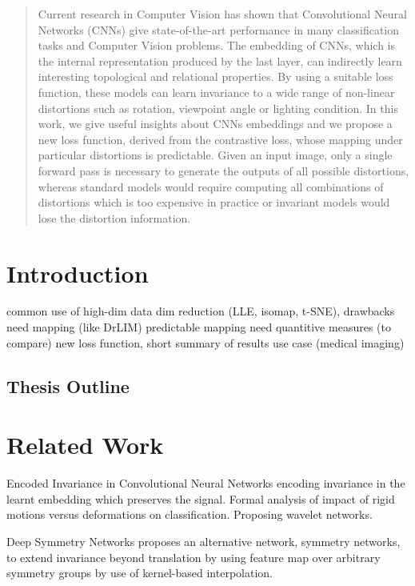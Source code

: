 \documentclass[a4paper,12pt]{report}
\begin{document}
\begin{abstract}
    Current research in Computer Vision has shown that Convolutional Neural Networks (CNNs) give state-of-the-art performance in many classification tasks and Computer Vision problems.
    The embedding of CNNs, which is the internal representation produced by the last layer, can indirectly learn interesting topological and relational properties.
    By using a suitable loss function, these models can learn invariance to a wide range of non-linear distortions such as rotation, viewpoint angle or lighting condition.
    In this work, we give useful insights about CNNs embeddings and we propose a new loss function, derived from the contrastive loss, whose mapping under particular distortions is predictable. 
    Given an input image, only a single forward pass is necessary to generate the outputs of all possible distortions, whereas standard models would require computing all combinations of distortions which is too expensive in practice or invariant models would lose the distortion information.
\end{abstract}

\chapter{Introduction}
common use of high-dim data
dim reduction (LLE, isomap, t-SNE), drawbacks
need mapping (like DrLIM)
predictable mapping
need quantitive measures (to compare)
new loss function, short summary of results
use case (medical imaging)

\section{Thesis Outline}

\chapter{Related Work}
Encoded Invariance in Convolutional Neural Networks
encoding invariance in the learnt embedding which preserves the signal. Formal analysis of impact of rigid motions versus deformations on classification. Proposing wavelet networks.

Deep Symmetry Networks
proposes an alternative network, symmetry networks, to extend invariance beyond translation by using feature map over arbitrary symmetry groups by use of kernel-based interpolation.
\end{document}
